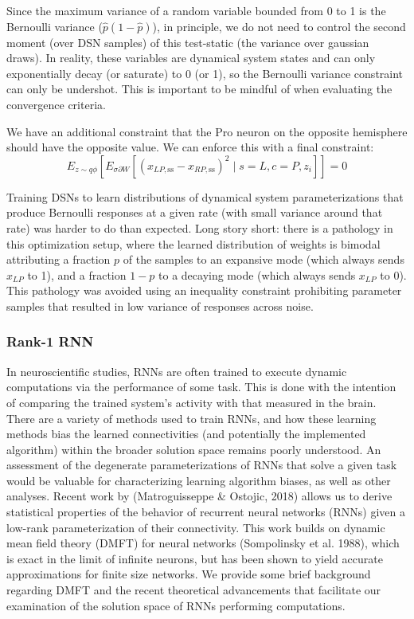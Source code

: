 \documentclass[11pt]{article}
\begin{document}
Since the maximum variance of a random variable bounded from 0 to 1 is the Bernoulli variance ($\hat{p}(1-\hat{p})$), in principle, we do not need to control the second moment (over DSN samples) of this test-static (the variance over gaussian draws).  In reality, these variables are dynamical system states and can only exponentially decay (or saturate) to 0 (or 1), so the Bernoulli variance constraint can only be undershot.  This is important to be mindful of when evaluating the convergence criteria.

We have an additional constraint that the Pro neuron on the opposite hemisphere should have the opposite value.  We can enforce this with a final constraint:
\begin{equation}
E_{z \sim q\phi} \left[ E_{\sigma \partial W} \left[ (x_{LP,\text{ss}} - x_{RP,\text{ss}})^2  \mid s=L, c=P, z_i \right] \right] = 0
\end{equation}

Training DSNs to learn distributions of dynamical system parameterizations that produce Bernoulli responses at a given rate (with small variance around that rate) was harder to do than expected.  Long story short: there is a pathology in this optimization setup, where the learned distribution of weights is bimodal attributing a fraction $p$ of the samples to an expansive mode (which always sends $x_{LP}$ to 1), and a fraction $1-p$ to a decaying mode (which always sends $x_{LP}$ to 0).  This pathology was avoided using an inequality constraint prohibiting parameter samples that resulted in low variance of responses across noise.

\subsubsection{Rank-1 RNN}
In neuroscientific studies, RNNs are often trained to execute dynamic computations via the performance of some task.  This is done with the intention of comparing the trained system's activity with that measured in the brain. There are a variety of methods used to train RNNs, and how these learning methods bias the learned connectivities (and potentially the implemented algorithm) within the broader solution space remains poorly understood. An assessment of the degenerate parameterizations of RNNs that solve a given task would be valuable for characterizing learning algorithm biases, as well as other analyses.  Recent work by (Matroguisseppe \& Ostojic, 2018) allows us to derive statistical properties of the behavior of recurrent neural networks (RNNs) given a low-rank parameterization of their connectivity.  This work builds on dynamic mean field theory (DMFT) for neural networks (Sompolinsky et al. 1988), which is exact in the limit of infinite neurons, but has been shown to yield accurate approximations for finite size networks.  We provide some brief background regarding DMFT and the recent theoretical advancements that facilitate our examination of the solution space of RNNs performing computations.
\end{document}
